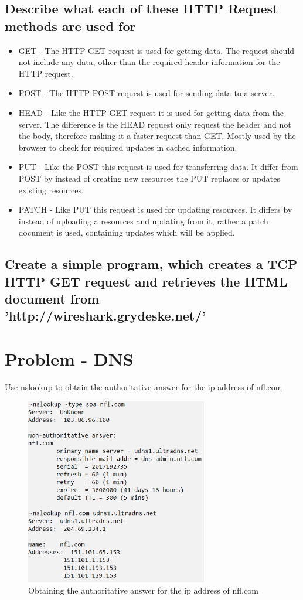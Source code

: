 \documentclass[12pt, a4paper]{article}
\begin{document}
		\subsection{Describe what each of these HTTP Request methods are used for}
			\begin{itemize}
				\item GET - The HTTP GET request is used for getting data. The request should not include any data, other than the required header information for the HTTP request.
				\item POST - The HTTP POST request is used for sending data to a server. 
				\item HEAD - Like the HTTP GET request it is used for getting data from the server. The difference is the HEAD request only request the header and not the body, therefore making it a faster request than GET. Mostly used by the browser to check for required updates in cached information.
				\item PUT - Like the POST this request is used for transferring data. It differ from POST by instead of creating new resources the PUT replaces or updates existing resources.
				\item PATCH - Like PUT this request is used for updating resources. It differs by instead of uploading a resources and updating from it, rather a patch document is used, containing updates which will be applied.
			\end{itemize}
		\subsection{Create a simple program, which creates a TCP HTTP GET request and retrieves the HTML document from 'http://wireshark.grydeske.net/'}
			
			\clearpage
	\section{Problem - DNS}
		Use nslookup to obtain the authoritative answer for the ip address of nfl.com
		\begin{figure}[h!]
			\includegraphics[width=300px]{assets/nslookup.png}
			\centering
			\caption{Obtaining the authoritative answer for the ip address of nfl.com}
		\end{figure}
			\clearpage
\end{document}
